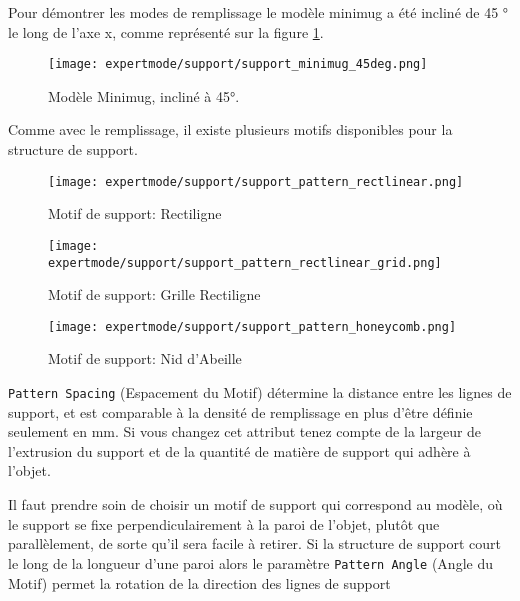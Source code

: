 Pour d\'emontrer les modes de remplissage le mod\`ele minimug a \'et\'e inclin\'e de 45 ° le long de l'axe x, comme repr\'esent\'e sur la figure \ref{fig:support_minimug_45deg}.

\begin{figure}[H]
\centering
\texttt{[image: expertmode/support/support\_minimug\_45deg.png]}
\caption{Mod\`ele Minimug, inclin\'e \`a 45°.}
\label{fig:support_minimug_45deg}
\end{figure}

Comme avec le remplissage, il existe plusieurs motifs disponibles pour la structure de support.

\begin{figure}[H]
\centering
\texttt{[image: expertmode/support/support\_pattern\_rectlinear.png]}
\caption{Motif de support: Rectiligne}
\label{fig:support_pattern_rectlinear}
\end{figure}

\begin{figure}[H]
\centering
\texttt{[image: expertmode/support/support\_pattern\_rectlinear\_grid.png]}
\caption{Motif de support: Grille Rectiligne}
\label{fig:support_pattern_rectlinear_grid}
\end{figure}

\begin{figure}[H]
\centering
\texttt{[image: expertmode/support/support\_pattern\_honeycomb.png]}
\caption{Motif de support: Nid d'Abeille}
\label{fig:support_pattern_honeycomb}
\end{figure}


\texttt{Pattern Spacing} (Espacement du Motif) d\'etermine la distance entre les lignes de support, et est comparable \`a la densit\'e de remplissage en plus d'\^etre d\'efinie seulement en mm. Si vous changez cet attribut tenez compte de la largeur de l'extrusion du support et de la quantit\'e de mati\`ere de support qui adh\`ere \`a l'objet.

Il faut prendre soin de choisir un motif de support qui correspond au mod\`ele, o\`u le support se fixe perpendiculairement \`a la paroi de l'objet, plut\^ot que parall\`element, de sorte qu'il sera facile \`a retirer.  Si la structure de support court le long de la longueur d'une paroi alors le param\`etre \texttt{Pattern Angle} (Angle du Motif) permet la rotation de la direction des lignes de support

